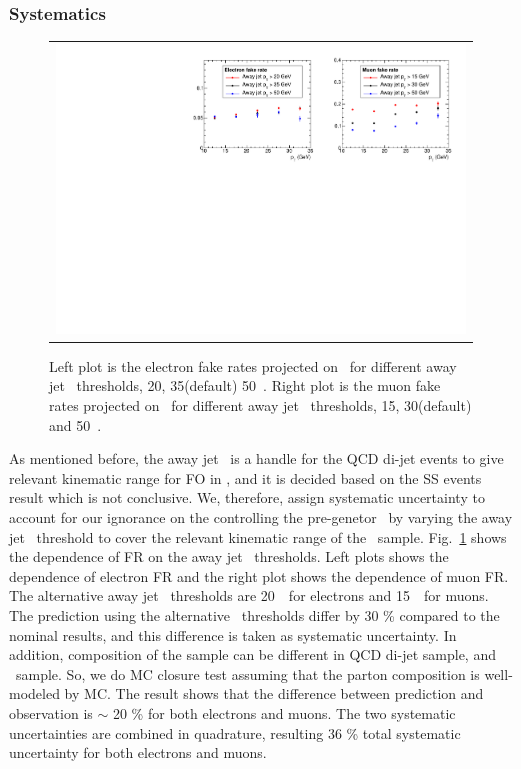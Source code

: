 \subsubsection{Systematics}
%
\begin{figure}[htp] 
\centering 
\begin{tabular}{c} 
\includegraphics[width=1.0\textwidth]{figures/FR_jetpt_variation.pdf}
\end{tabular} 
\caption{Left plot is the electron fake rates projected on \pt\ for 
different away jet \pt\ thresholds, 20, 35(default) 50~\GeV. 
Right plot is the muon fake rates projected on \pt\ for
different away jet \pt\ thresholds, 15, 30(default) and 50~\GeV.} 
\label{fig:FR_jetpt_variation} 
\end{figure} 
As mentioned before, the away jet \pt\ is a handle for the QCD di-jet events 
to give relevant kinematic range for FO in \Wjets, and it is decided based on the SS events 
result which is not conclusive. We, therefore, assign systematic uncertainty 
to account for our ignorance on the controlling the pre-genetor \pt\ 
by varying the away jet \pt\ threshold
to cover the relevant kinematic range of the \Wjets\ sample.
Fig.~\ref{fig:FR_jetpt_variation} shows the dependence of FR on the 
away jet \pt\ thresholds. Left plots shows the dependence of electron 
FR and the right plot shows the dependence of muon FR. 
The alternative away jet \pt\ thresholds are 20~\GeV\ for electrons 
and 15~\GeV\ for muons. The prediction using the alternative \pt\ thresholds
differ by 30 \% compared to the nominal results, and this difference 
is taken as systematic uncertainty. 
In addition, composition of the sample can be different in QCD di-jet sample, 
and \Wjets\ sample. So, we do MC closure test assuming that the parton composition 
is well-modeled by MC. The result shows that the difference between 
prediction and observation is $\sim$ 20 \% for both electrons and muons.
The two systematic uncertainties are combined in quadrature, resulting 
36 \% total systematic uncertainty for both electrons and muons. 

